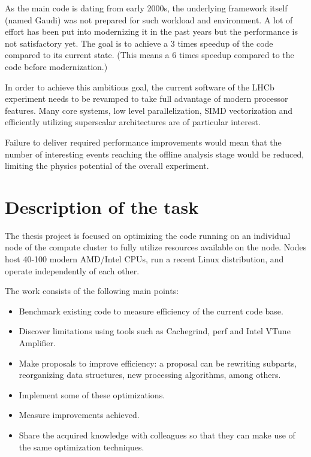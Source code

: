 \documentclass[12pt]{article}
\begin{document}
	\vspace{0.7pc}	
	As the main code is dating from early 2000s, the underlying framework itself (named Gaudi) was not prepared for such workload and environment. A lot of effort has been put into modernizing it in the past years but the performance is not satisfactory yet. The goal is to achieve a 3 times speedup of the code compared to its current state. (This means a 6 times speedup compared to the code before modernization.)
	
	\vspace{0.7pc}
	In order to achieve this ambitious goal, the current software of the LHCb experiment needs to be revamped to take full advantage of modern processor features. Many core systems, low level parallelization, SIMD vectorization and efficiently utilizing superscalar architectures are of particular interest.	
	
	\vspace{0.7pc}
	Failure to deliver required performance improvements would mean that the number of interesting events reaching the offline analysis stage would be reduced, limiting the physics potential of the overall experiment.	
	
	
	\newpage
	\section{Description of the task}
	
	The thesis project is focused on optimizing the code running on an individual node of the compute cluster to fully utilize resources available on the node. Nodes host 40-100 modern AMD/Intel CPUs, run a recent Linux distribution, and operate independently of each other.
		
	\vspace{1pc}
	The work consists of the following main points:
	
	\begin{itemize}
		\item Benchmark existing code to measure efficiency of the current code base.
		\item Discover limitations using tools such as Cachegrind, perf and Intel VTune Amplifier.
		\item Make proposals to improve efficiency: a proposal can be rewriting subparts, reorganizing data structures, new processing algorithms, among others.
		\item Implement some of these optimizations.
		\item Measure improvements achieved.
		\item Share the acquired knowledge with colleagues so that they can make use of the same optimization techniques.
	\end{itemize}	
		
\end{document}
